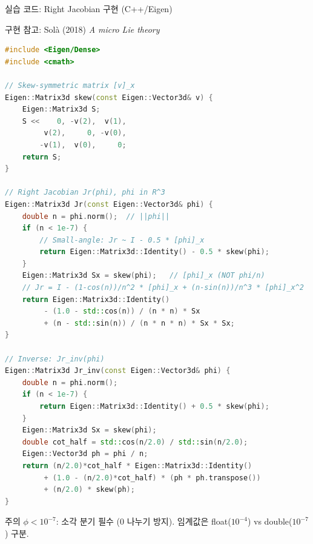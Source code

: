 \begin{frame}[fragile, shrink=60]{실습 코드: Right Jacobian 구현 (C++/Eigen)}
  \begin{block}{구현 참고: Solà (2018) \textit{A micro Lie theory}}
  \end{block}
  \begin{lstlisting}[language=C++, basicstyle=\footnotesize\ttfamily,
      keywordstyle=\color{blue}, commentstyle=\color{gray},
      morekeywords={Matrix3d, Vector3d, auto}]
#include <Eigen/Dense>
#include <cmath>

// Skew-symmetric matrix [v]_x
Eigen::Matrix3d skew(const Eigen::Vector3d& v) {
    Eigen::Matrix3d S;
    S <<    0, -v(2),  v(1),
         v(2),     0, -v(0),
        -v(1),  v(0),     0;
    return S;
}

// Right Jacobian Jr(phi), phi in R^3
Eigen::Matrix3d Jr(const Eigen::Vector3d& phi) {
    double n = phi.norm();  // ||phi||
    if (n < 1e-7) {
        // Small-angle: Jr ~ I - 0.5 * [phi]_x
        return Eigen::Matrix3d::Identity() - 0.5 * skew(phi);
    }
    Eigen::Matrix3d Sx = skew(phi);   // [phi]_x (NOT phi/n)
    // Jr = I - (1-cos(n))/n^2 * [phi]_x + (n-sin(n))/n^3 * [phi]_x^2
    return Eigen::Matrix3d::Identity()
         - (1.0 - std::cos(n)) / (n * n) * Sx
         + (n - std::sin(n)) / (n * n * n) * Sx * Sx;
}

// Inverse: Jr_inv(phi)
Eigen::Matrix3d Jr_inv(const Eigen::Vector3d& phi) {
    double n = phi.norm();
    if (n < 1e-7) {
        return Eigen::Matrix3d::Identity() + 0.5 * skew(phi);
    }
    Eigen::Matrix3d Sx = skew(phi);
    double cot_half = std::cos(n/2.0) / std::sin(n/2.0);
    Eigen::Vector3d ph = phi / n;
    return (n/2.0)*cot_half * Eigen::Matrix3d::Identity()
         + (1.0 - (n/2.0)*cot_half) * (ph * ph.transpose())
         + (n/2.0) * skew(ph);
}
  \end{lstlisting}
  \begin{alertblock}{\small 주의}
    \footnotesize
    $\phi < 10^{-7}$: 소각 분기 필수 (0 나누기 방지). 임계값은 float($10^{-4}$) vs double($10^{-7}$) 구분.
  \end{alertblock}
\end{frame}


